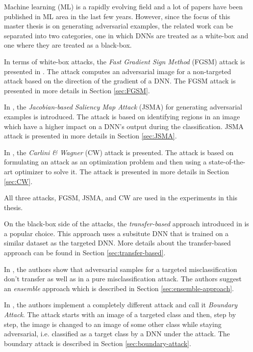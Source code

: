 Machine learning (ML) is a rapidly evolving field and a lot of papers have been published in ML area in the last few years. However, since the focus of this master thesis is on generating adversarial examples, the related work can be separated into two categories, one in which DNNs are treated as a white-box and one where they are treated as a black-box. 

In terms of white-box attacks, the \textit{Fast Gradient Sign Method} (FGSM) attack is presented  in \cite{fgsm-original}. The attack computes an adversarial image for a non-targeted attack based on the direction of the gradient of a DNN. The FGSM attack is presented in more details in Section \ref{sec:FGSM}.

In \cite{DBLP:journals/corr/PapernotMJFCS15}, the \textit{Jacobian-based Saliency Map Attack} (JSMA) for generating adversarial examples is introduced. The attack is based on identifying regions in an image which have a higher impact on a DNN's output during the classification. JSMA attack is presented in more details in  Section \ref{sec:JSMA}.

In \cite{DBLP:journals/corr/CarliniW16a}, the \textit{Carlini \& Wagner} (CW) attack is presented. The attack is based on formulating an attack as an optimization problem and then using a state-of-the-art optimizer to solve it. The attack is presented in more details in Section \ref{sec:CW}.

All three attacks, FGSM, JSMA, and CW are used in the experiments in this thesis.

On the black-box side of the attacks, the \textit{transfer-based} approach introduced in \cite{DBLP:journals/corr/PapernotMGJCS16} is a popular choice. This approach uses a subsitute DNN that is trained on a similar dataset as the targeted DNN. More details about the transfer-based approach can be found in Section \ref{sec:transfer-based}.

In \cite{ensemble-attack}, the authors show that adversarial samples for a targeted misclassification don't transfer as well as in a pure misclassification attack. The authors suggest an \textit{ensemble} approach which is described in Section \ref{sec:ensemble-approach}.

In \cite{brendel2018decisionbased}, the authors implement a completely different attack and call it \textit{Boundary Attack}. The attack starts with an image of a targeted class and then, step by step, the image is changed to an image of some other class while staying adversarial, i.e. classified as a target class by a DNN under the attack. The boundary attack is described in Section \ref{sec:boundary-attack}.

